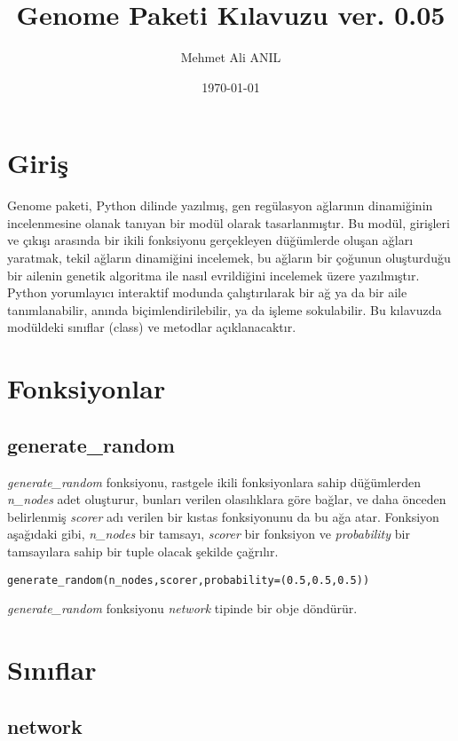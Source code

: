 \documentclass[a4paper,12t]{article}
\title{Genome Paketi Kılavuzu ver. 0.05}
\author{Mehmet Ali ANIL}
\date{\today}
\begin{document}
\maketitle

\tableofcontents

\section{Giriş}

Genome paketi, Python dilinde yazılmış, gen regülasyon ağlarının dinamiğinin incelenmesine olanak tanıyan bir modül olarak tasarlanmıştır. Bu modül, girişleri ve çıkışı arasında bir ikili fonksiyonu gerçekleyen düğümlerde oluşan ağları yaratmak, tekil ağların dinamiğini incelemek, bu ağların bir çoğunun oluşturduğu bir ailenin genetik algoritma ile nasıl evrildiğini incelemek üzere yazılmıştır. Python yorumlayıcı interaktif modunda çalıştırılarak bir ağ ya da bir aile tanımlanabilir, anında biçimlendirilebilir, ya da işleme sokulabilir. Bu kılavuzda modüldeki sınıflar (class) ve metodlar açıklanacaktır. 

\section{Fonksiyonlar}
\subsection{generate\_random}

\emph{generate\_random} fonksiyonu, rastgele ikili fonksiyonlara sahip düğümlerden \emph{n\_nodes} adet oluşturur, bunları verilen olasılıklara göre bağlar, ve daha önceden belirlenmiş \emph{scorer} adı verilen  bir kıstas fonksiyonunu da bu ağa atar. Fonksiyon aşağıdaki gibi, \emph{n\_nodes} bir tamsayı, \emph{scorer} bir fonksiyon ve \emph{probability} bir tamsayılara sahip bir tuple olacak şekilde çağrılır. 

\label{code_generate_random}
\begin{lstlisting}
generate_random(n_nodes,scorer,probability=(0.5,0.5,0.5))
\end{lstlisting}

\emph{generate\_random} fonksiyonu \emph{network} tipinde bir obje döndürür. 

\section{Sınıflar}
\subsection{network}
\end{document}
